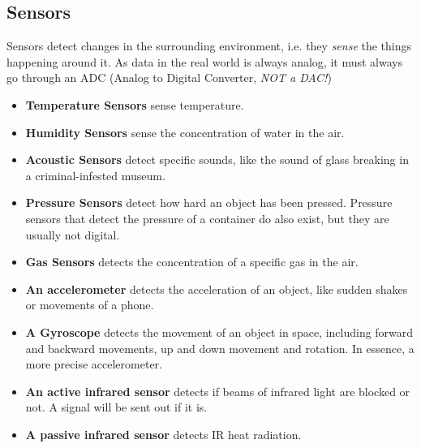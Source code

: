 \documentclass[../main.tex]{subfiles}
\begin{document}
\subsection{Sensors}
\label{3:sec:sensors}

Sensors detect changes in the surrounding environment, i.e. they \emph{sense} the things happening around it. As data in the real world is always analog, it must always go through an ADC (Analog to Digital Converter, \emph{NOT a DAC!})

\begin{itemize}
    \item \textbf{Temperature Sensors} sense temperature.
    \item \textbf{Humidity Sensors} sense the concentration of water in the air.
    \item \textbf{Acoustic Sensors} detect specific sounds, like the sound of glass breaking in a criminal-infested museum.
    \item \textbf{Pressure Sensors} detect how hard an object has been pressed. Pressure sensors that detect the pressure of a container do also exist, but they are usually not digital.
    \item \textbf{Gas Sensors} detects the concentration of a specific gas in the air.
    \item \textbf{An accelerometer} detects the acceleration of an object, like sudden shakes or movements of a phone.
    \item \textbf{A Gyroscope} detects the movement of an object in space, including forward and backward movements, up and down movement and rotation. In essence, a more precise accelerometer.
    \item \textbf{An active infrared sensor} detects if beams of infrared light are blocked or not. A signal will be sent out if it is.
    \item \textbf{A passive infrared sensor} detects IR heat radiation.
\end{itemize}
\end{document}
